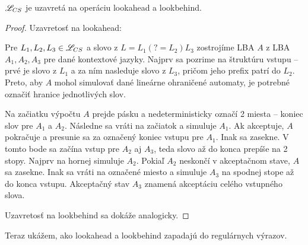 \begin{veta} \label{CS-lookahead}
$ \mathscr{L}_{CS} $ je uzavretá na operáciu lookahead a lookbehind.
\end{veta} 
\begin{proof}
Uzavretosť na lookahead:

Pre $ L_{1}, L_{2}, L_{3} \in \mathscr{L}_{CS} $ a slovo z $ L = L_{1}(?=L_{2})L_{3} $ zostrojíme LBA $A$ z LBA $A_1, A_2, A_3$ pre dané kontextové jazyky. Najprv sa pozrime na štruktúru vstupu -- prvé je slovo z $L_1$ a za ním nasleduje slovo z $L_3$, pričom jeho prefix patrí do $L_2$. Preto, aby $A$ mohol simulovať dané lineárne ohraničené automaty, je potrebné označiť hranice jednotlivých slov.

 Na začiatku výpočtu $A$ prejde pásku a nedeterministicky označí 2 miesta -- koniec slov pre $A_1$ a $A_2$. Následne sa vráti na začiatok a simuluje $A_1$. Ak akceptuje, $A$ pokračuje a presunie sa za označený koniec vstupu pre $A_1$. Inak sa zasekne. V tomto bode sa začína vstup pre $A_2$ aj $A_3$, teda slovo až do konca prepíše na 2 stopy. Najprv na hornej simuluje $A_2$. Pokiaľ $A_2$ neskončí v akceptačnom stave, $A$ sa zasekne. Inak sa vráti na označené miesto a simuluje $A_3$ na spodnej stope až do konca vstupu. Akceptačný stav $A_3$ znamená akceptáciu celého vstupného slova.

Uzavretosť na lookbehind sa dokáže analogicky.
\end{proof}

Teraz ukážem, ako lookahead a lookbehind zapadajú do regulárnych výrazov.

